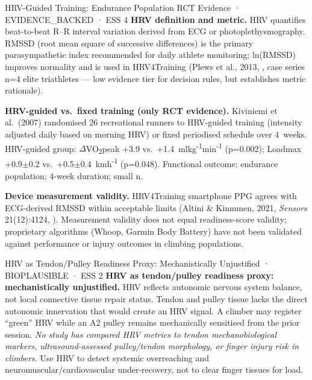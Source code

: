 \begin{evidencebox}{HRV-Guided Training: Endurance Population RCT Evidence · EVIDENCE\_BACKED · ESS 4}
\textbf{HRV definition and metric.} HRV quantifies beat-to-beat R--R interval variation derived from ECG or photoplethysmography. RMSSD (root mean square of successive differences) is the primary parasympathetic index recommended for daily athlete monitoring; ln(RMSSD) improves normality and is used in HRV4Training (Plews et al., 2013, \cite{WHHE13}, case series n=4 elite triathletes --- low evidence tier for decision rules, but establishes metric rationale).

\textbf{HRV-guided vs.\ fixed training (only RCT evidence).} Kiviniemi et al.\ (2007) randomised 26 recreational runners to HRV-guided training (intensity adjusted daily based on morning HRV) or fixed periodised schedule over 4~weeks. HRV-guided group: $\Delta$VO\textsubscript{2}peak +3.9 vs.\ +1.4~ml\textperiodcentered{}kg\textsuperscript{-1}\textperiodcentered{}min\textsuperscript{-1} (p=0.002); Loadmax +0.9$\pm$0.2 vs.\ +0.5$\pm$0.4~km\textperiodcentered{}h\textsuperscript{-1} (p=0.048). Functional outcome; endurance population; 4-week duration; small n. \cite{KHKT07}

\textbf{Device measurement validity.} HRV4Training smartphone PPG agrees with ECG-derived RMSSD within acceptable limits (Altini \& Kinnunen, 2021, \emph{Sensors} 21(12):4124, \cite{MS21}). Measurement validity does not equal readiness-score validity; proprietary algorithms (Whoop, Garmin Body Battery) have not been validated against performance or injury outcomes in climbing populations.
\end{evidencebox}

\begin{bioplausbox}{HRV as Tendon/Pulley Readiness Proxy: Mechanistically Unjustified · BIOPLAUSIBLE · ESS 2}
\textbf{HRV as tendon/pulley readiness proxy: mechanistically unjustified.} HRV reflects autonomic nervous system balance, not local connective tissue repair status. Tendon and pulley tissue lacks the direct autonomic innervation that would create an HRV signal. A climber may register ``green'' HRV while an A2 pulley remains mechanically sensitised from the prior session. \emph{No study has compared HRV metrics to tendon mechanobiological markers, ultrasound-assessed pulley/tendon morphology, or finger injury risk in climbers.} Use HRV to detect systemic overreaching and neuromuscular/cardiovascular under-recovery, not to clear finger tissues for load.
\end{bioplausbox}

